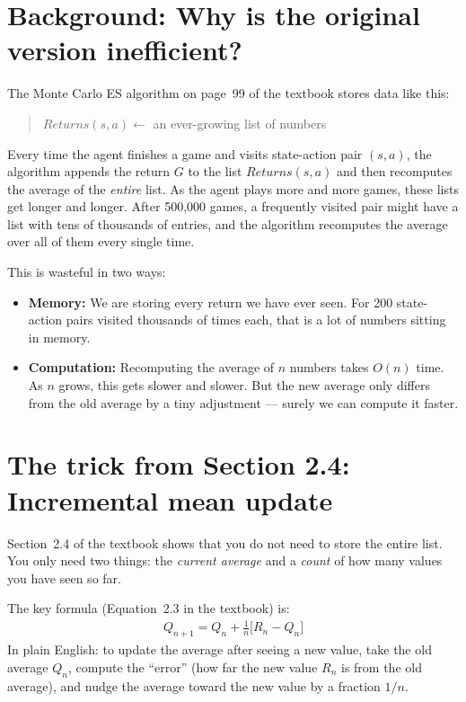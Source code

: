 \documentclass[11pt]{article}
\begin{document}
\section*{Background: Why is the original version inefficient?}

The Monte Carlo ES algorithm on page~99 of the textbook stores data like this:

\begin{quote}
    $Returns(s, a) \leftarrow$ an ever-growing list of numbers
\end{quote}

Every time the agent finishes a game and visits state-action pair $(s, a)$, the algorithm appends the return $G$ to the list $Returns(s, a)$ and then recomputes the average of the \textit{entire} list. As the agent plays more and more games, these lists get longer and longer. After 500{,}000 games, a frequently visited pair might have a list with tens of thousands of entries, and the algorithm recomputes the average over all of them every single time.

This is wasteful in two ways:
\begin{itemize}[nosep]
    \item \textbf{Memory:} We are storing every return we have ever seen. For 200 state-action pairs visited thousands of times each, that is a lot of numbers sitting in memory.
    \item \textbf{Computation:} Recomputing the average of $n$ numbers takes $O(n)$ time. As $n$ grows, this gets slower and slower. But the new average only differs from the old average by a tiny adjustment --- surely we can compute it faster.
\end{itemize}

\section*{The trick from Section 2.4: Incremental mean update}

Section~2.4 of the textbook shows that you do not need to store the entire list. You only need two things: the \textit{current average} and a \textit{count} of how many values you have seen so far.

The key formula (Equation~2.3 in the textbook) is:
\begin{align}
    Q_{n+1} = Q_n + \frac{1}{n}\Big[R_n - Q_n\Big]
\end{align}
In plain English: to update the average after seeing a new value, take the old average $Q_n$, compute the ``error'' (how far the new value $R_n$ is from the old average), and nudge the average toward the new value by a fraction $1/n$.
\end{document}
